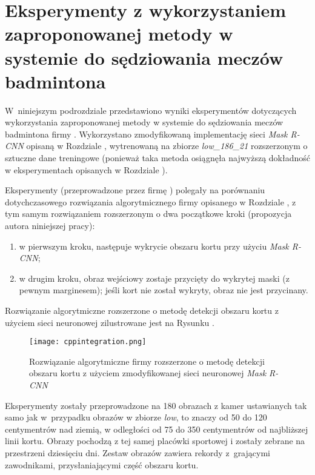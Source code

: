 \section{Eksperymenty z wykorzystaniem zaproponowanej metody w systemie do sędziowania meczów badmintona}
\label{sec:integrationblue}

W~niniejszym podrozdziale przedstawiono wyniki eksperymentów dotyczących wykorzystania zaproponowanej metody w systemie do sędziowania meczów badmintona firmy \blue{}.
Wykorzystano zmodyfikowaną implementację sieci \textit{Mask R-CNN} opisaną w Rozdziale , wytrenowaną na zbiorze \textit{low\_186\_21} rozszerzonym o sztuczne dane treningowe (ponieważ taka metoda osiągnęła najwyższą dokładność w eksperymentach opisanych w Rozdziale ).

Eksperymenty (przeprowadzone przez firmę \blue{}) polegały na porównaniu dotychczasowego rozwiązania algorytmicznego firmy \blue{} opisanego w Rozdziale , z tym samym rozwiązaniem rozszerzonym o dwa początkowe kroki (propozycja autora niniejszej pracy):

\begin{enumerate}
  \item w pierwszym kroku, następuje wykrycie obszaru kortu przy użyciu \textit{Mask R-CNN};
  \item w drugim kroku, obraz wejściowy zostaje przycięty do wykrytej maski (z pewnym marginesem); jeśli kort nie został wykryty, obraz nie jest przycinany.
\end{enumerate}

Rozwiązanie algorytmiczne rozszerzone o metodę detekcji obszaru kortu z użyciem sieci neuronowej zilustrowane jest na Rysunku .

\begin{figure}[h]
  \centering
  \texttt{[image: cppintegration.png]}
  \caption{Rozwiązanie algorytmiczne firmy \blue{} rozszerzone o metodę detekcji obszaru kortu z użyciem zmodyfikowanej sieci neuronowej \textit{Mask R-CNN}}
  \label{fig:cppintegration}
\end{figure}

Eksperymenty zostały przeprowadzone na 180 obrazach z kamer ustawianych tak samo jak w~przypadku obrazów w zbiorze \textit{low}, to znaczy od 50 do 120 centymentrów nad ziemią, w odległości od 75 do 350 centymentrów od najbliższej linii kortu. Obrazy pochodzą z tej samej placówki sportowej i zostały zebrane na przestrzeni dziesięciu dni. Zestaw obrazów zawiera rekordy z~grającymi zawodnikami, przysłaniającymi część obszaru kortu.

